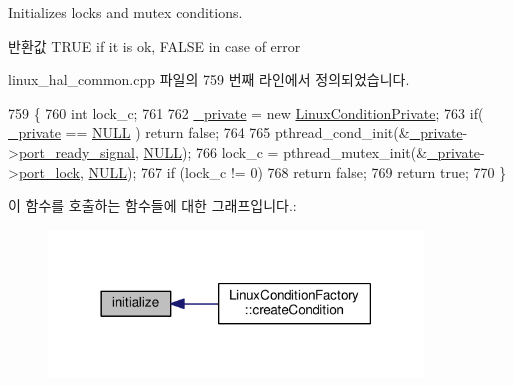 Initializes locks and mutex conditions. 

\begin{DoxyReturn}{반환값}
T\+R\+UE if it is ok, F\+A\+L\+SE in case of error 
\end{DoxyReturn}


linux\+\_\+hal\+\_\+common.\+cpp 파일의 759 번째 라인에서 정의되었습니다.


\begin{DoxyCode}
759                                 \{
760     \textcolor{keywordtype}{int} lock\_c;
761 
762     \hyperlink{class_linux_condition_a3d5dfb7072495e32222b0bd0ac3975bb}{\_private} = \textcolor{keyword}{new} \hyperlink{struct_linux_condition_private}{LinuxConditionPrivate};
763     \textcolor{keywordflow}{if}( \hyperlink{class_linux_condition_a3d5dfb7072495e32222b0bd0ac3975bb}{\_private} == \hyperlink{openavb__types__base__pub_8h_a070d2ce7b6bb7e5c05602aa8c308d0c4}{NULL} ) \textcolor{keywordflow}{return} \textcolor{keyword}{false};
764 
765     pthread\_cond\_init(&\hyperlink{class_linux_condition_a3d5dfb7072495e32222b0bd0ac3975bb}{\_private}->\hyperlink{struct_linux_condition_private_a661b628f98aeac53e3761d30a8201add}{port\_ready\_signal}, 
      \hyperlink{openavb__types__base__pub_8h_a070d2ce7b6bb7e5c05602aa8c308d0c4}{NULL});
766     lock\_c = pthread\_mutex\_init(&\hyperlink{class_linux_condition_a3d5dfb7072495e32222b0bd0ac3975bb}{\_private}->\hyperlink{struct_linux_condition_private_a487bd691e1e2e31c958ff8a1fbc72c9e}{port\_lock}, \hyperlink{openavb__types__base__pub_8h_a070d2ce7b6bb7e5c05602aa8c308d0c4}{NULL});
767     \textcolor{keywordflow}{if} (lock\_c != 0)
768         \textcolor{keywordflow}{return} \textcolor{keyword}{false};
769     \textcolor{keywordflow}{return} \textcolor{keyword}{true};
770 \}
\end{DoxyCode}


이 함수를 호출하는 함수들에 대한 그래프입니다.\+:
\nopagebreak
\begin{figure}[H]
\begin{center}
\leavevmode
\includegraphics[width=282pt]{class_linux_condition_ab3e7cc706c522b3231f9156bba461436_icgraph}
\end{center}
\end{figure}


